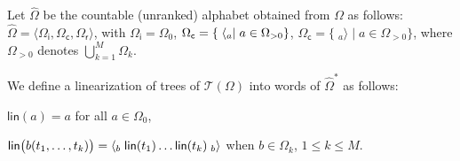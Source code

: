 \documentclass[runningheads]{llncs}
\def\<#1>{\langle #1 \rangle}
\newcommand{\T}{\mathcal{T}}
\newcommand{\call}[1]{\ensuremath #1} %
\newcommand{\return}[1]{\ensuremath #1} %
\def\Omegai{{\Omega_\mathsf{i}}}
\def\Omegac{{\Omega_\mathsf{c}}}
\def\Omegar{{\Omega_\mathsf{r}}}
\newcommand{\lin}{\mathsf{lin}}
\begin{document}
\renewcommand{\call}[1]{\ensuremath \langle_{#1}}
\renewcommand{\return}[1]{\ensuremath {}_{#1}{\rangle}} %

Let $\hat\Omega$ be the countable (unranked) alphabet obtained from 
$\Omega$ as follows: 
$\hat\Omega = \< \Omegai, \Omegac, \Omegar >$, with
$\Omegai = \Omega_0$, 
$\Omegac = \{ \; \call{a} \mid a \in \Omega_{>0} \}$,
$\Omegac = \{ \; \return{a} \mid a \in \Omega_{>0} \}$,
where $\Omega_{>0}$ denotes $\bigcup_{k = 1}^{M} \Omega_k$.

\noindent
We define a linearization of trees of $\T(\Omega)$ into 
words of $\hat{\Omega}^*$ as follows:
\begin{description}
\item $\lin(a) = a$ for all $a \in \Omega_0$, 
\item $\lin\bigl( b(t_1, \ldots, t_k)\bigr) = 
       \call{b} \; \lin(t_1) \ldots \lin(t_k) \; \return{b}$ 
       when $b \in \Omega_k$, $1 \leq k \leq M$.
\end{description}

\end{document}
